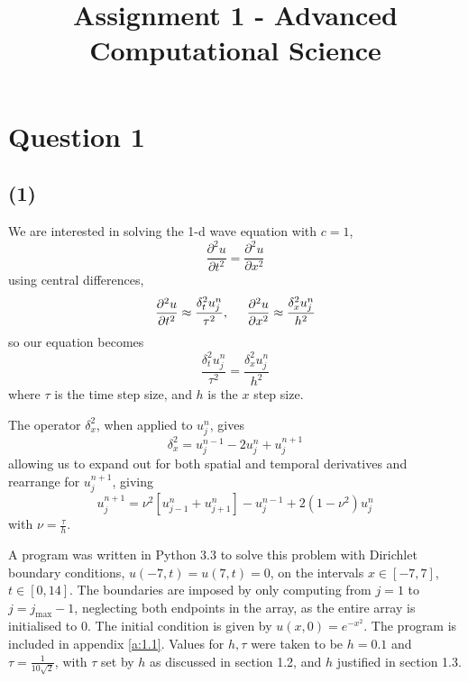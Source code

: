 \documentclass[10pt]{article}
\title{Assignment 1 - Advanced Computational Science}
\newcommand{\ujn}{u_{j}^{n}}
\newcommand{\ujpn}{u_{j+1}^{n}}
\newcommand{\ujmn}{u_{j-1}^{n}}
\newcommand{\ujnp}{u_{j}^{n+1}}
\newcommand{\ujnm}{u_{j}^{n-1}}
\begin{document}
\maketitle

\section*{Question 1}
\subsection*{(1)}
We are interested in solving the 1-d wave equation with $c=1$,
\begin{equation}
\frac{\partial^2 u}{\partial t^2} = \frac{\partial^2 u}{\partial x^2}
\label{e:we}
\end{equation}
using central differences,
\begin{equation}
\frac{\partial^2 u}{\partial t^2} \approx \frac{\delta_t^2 \ujn}{\tau^2},
\hspace{5mm}
\frac{\partial^2 u}{\partial x^2} \approx \frac{\delta_x^2 \ujn}{h^2}
\label{e:central}
\end{equation}
so our equation becomes
\begin{equation}
\frac{\delta_t^2 \ujn}{\tau^2} = \frac{\delta_x^2 \ujn}{h^2}
\label{e:wecd}
\end{equation}
where $\tau$ is the time step size, and $h$ is the $x$ step size.

The operator $\delta_x ^2$, when applied to $\ujn$, gives
$$
\delta_x^2 = \ujnm - 2\ujn + \ujnp
$$
allowing us to expand out for both spatial and temporal derivatives and rearrange
for $\ujnp$, giving
\begin{equation}
\ujnp = \nu^2 \left[\ujmn + \ujpn \right] - \ujnm + 2(1 - \nu^2)\ujn
\label{e:cd}
\end{equation}
with $\nu = \frac{\tau}{h}$.

A program was written in Python 3.3 to solve this problem with Dirichlet boundary
conditions, $u(-7,t) = u(7,t) = 0$, on the intervals $x \in \left[-7,7\right]$,
$t \in \left[0,14\right] $. The boundaries are imposed by only computing from
$j=1$ to $j=j_\text{max} -1$, neglecting both endpoints in the array, as the entire
array is initialised to 0.
The initial condition is given by $u(x,0) = e^{-x^2}$.
The program is included in appendix \ref{a:1.1}.
Values for $h,\tau$ were taken to be $h=0.1$ and $\tau = \frac{1}{10\sqrt{2}}$, with
$\tau$ set by $h$ as discussed in section 1.2, and $h$ justified in section 1.3.
\end{document}
